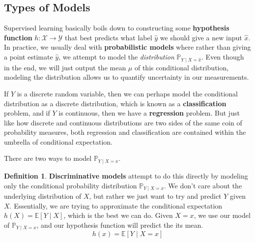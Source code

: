 \documentclass{article}
\theoremstyle{definition}
\theoremstyle{remark}
\theoremstyle{definition}
\newtheorem{definition}{Definition}[section]
\begin{document}
\subsection{Types of Models}

Supervised learning basically boils down to constructing some \textbf{hypothesis function} $h: \mathcal{X} \rightarrow \mathcal{Y}$ that best predicts what label $\hat{y}$ we should give a new input $\hat{x}$. In practice, we usually deal with \textbf{probabilistic models} where rather than giving a point estimate $\hat{y}$, we attempt to model the \textit{distribution} $\mathbb{P}_{Y \mid X = \hat{x}}$. Even though in the end, we will just output the mean $\mu$ of this conditional distribution, modeling the distribution allows us to quantify uncertainty in our measurements. 

If $Y$ is a discrete random variable, then we can perhaps model the conditional distribution as a discrete distribution, which is known as a \textbf{classification} problem, and if $Y$ is continuous, then we have a \textbf{regression} problem. But just like how discrete and continuous distributions are two sides of the same coin of probability measures, both regression and classification are contained within the umbrella of conditional expectation. 

There are two ways to model $\mathbb{P}_{Y \mid X = x}$. 

\begin{definition}
\textbf{Discriminative models} attempt to do this directly by  modeling only the conditional probability distribution $\mathbb{P}_{Y \mid X = x}$. We don't care about the underlying distribution of $X$, but rather we just want to try and predict $Y$ given $X$. Essentially, we are trying to approximate the conditional expectation $h(X) = \mathbb{E}[Y \mid X]$, which is the best we can do. Given $X = x$, we use our model of $\mathbb{P}_{Y \mid X = x}$, and our hypothesis function will predict the its mean. 
    \[h(x) = \mathbb{E}[Y \mid X = x]\]
\end{definition}
\end{document}
